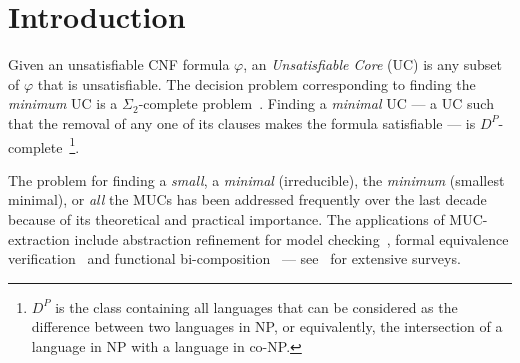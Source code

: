 \documentclass[twoside,11pt]{article}
\begin{document}


\section{Introduction}

Given an unsatisfiable CNF formula $\varphi$, an \emph{Unsatisfiable
Core} (UC) is any
subset of $\varphi$ that is unsatisfiable. The decision problem corresponding
to finding the \emph{minimum} UC is a $\Sigma_2$-complete problem~\cite{G06}.
Finding a \emph{minimal} UC --- a UC such that the removal of any one of its
clauses makes the formula satisfiable --- is
$D^P$-complete~\cite{PAPA88}\footnote{$D^P$ is the class containing all
languages that can be considered as the difference between two languages in
NP, or equivalently, the intersection of a language in NP with a language in
co-NP.}.

The problem for finding a \emph{small}, a \emph{minimal} (irreducible), the \emph{minimum} (smallest minimal), or \emph{all} the MUCs has been addressed frequently over the last decade~\cite{ZM03,GN03,BRUNI03,OH04,LYNCE04,DBLP:conf/ausai/ZhangLS06,GKS06,DHN06,SY07,B08,DBLP:conf/lpar/AsinNOR08,LS08,DBLP:conf/sat/MaarenW08,GKS08,DBLP:journals/eor/GregoireMP09,DBLP:conf/frocos/PietteHS09,DGHP09,LMLAMS09,DBLP:journals/jsw/ZhangSL09,NadelPhd,DBLP:conf/ismvl/Silva10,dvcon10am,RS11,BM11,SL11,BelovM12,DBLP:conf/cp/Wieringa12,DBLP:journals/aicom/BelovLM12,DBLP:conf/date/Belov0MM13,DBLP:conf/cav/Marques-SilvaJB13,LB13,NRS13,RyvchinPhd} because of its theoretical and practical importance. The applications of MUC-extraction include abstraction refinement for model checking~\cite{MA03,GGYA03,DBLP:conf/date/Belov0MM13}, formal equivalence verification~\cite{KKB09,dvcon10am} and functional bi-composition~\cite{DBLP:conf/dac/LeeJH08,DBLP:conf/vlsi/0001M11} --- see~\cite{DBLP:conf/ismvl/Silva10,N10} for extensive surveys.
\end{document}
